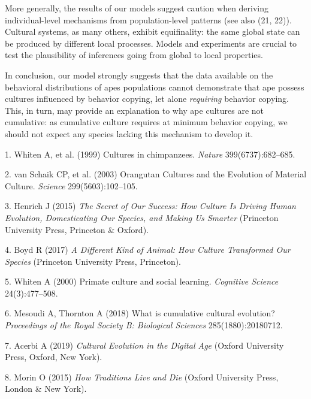 \documentclass[9pt,twocolumn,twoside,]{pnas-new}
\begin{document}
More generally, the results of our models suggest caution when deriving
individual-level mechanisms from population-level patterns (see also
(21, 22)). Cultural systems, as many others, exhibit equifinality: the
same global state can be produced by different local processes. Models
and experiments are crucial to test the plausibility of inferences going
from global to local properties.

In conclusion, our model strongly suggests that the data available on
the behavioral distributions of apes populations cannot demonstrate that
ape possess cultures influenced by behavior copying, let alone
\emph{requiring} behavior copying. This, in turn, may provide an
explanation to why ape cultures are not cumulative: as cumulative
culture requires at minimum behavior copying, we should not expect any
species lacking this mechanism to develop it.

\showmatmethods
\showacknow
\pnasbreak

\hypertarget{refs}{}
\leavevmode\hypertarget{ref-whiten_cultures_1999}{}%
1. Whiten A, et al. (1999) Cultures in chimpanzees. \emph{Nature}
399(6737):682--685.

\leavevmode\hypertarget{ref-van_schaik_orangutan_2003}{}%
2. van Schaik CP, et al. (2003) Orangutan Cultures and the Evolution of
Material Culture. \emph{Science} 299(5603):102--105.

\leavevmode\hypertarget{ref-henrich_secret_2015}{}%
3. Henrich J (2015) \emph{The Secret of Our Success: How Culture Is
Driving Human Evolution, Domesticating Our Species, and Making Us
Smarter} (Princeton University Press, Princeton \& Oxford).

\leavevmode\hypertarget{ref-boyd_different_2017}{}%
4. Boyd R (2017) \emph{A Different Kind of Animal: How Culture
Transformed Our Species} (Princeton University Press, Princeton).

\leavevmode\hypertarget{ref-whiten_primate_2000}{}%
5. Whiten A (2000) Primate culture and social learning. \emph{Cognitive
Science} 24(3):477--508.

\leavevmode\hypertarget{ref-mesoudi_what_2018}{}%
6. Mesoudi A, Thornton A (2018) What is cumulative cultural evolution?
\emph{Proceedings of the Royal Society B: Biological Sciences}
285(1880):20180712.

\leavevmode\hypertarget{ref-acerbi_cultural_2019}{}%
7. Acerbi A (2019) \emph{Cultural Evolution in the Digital Age} (Oxford
University Press, Oxford, New York).

\leavevmode\hypertarget{ref-morin_how_2015}{}%
8. Morin O (2015) \emph{How Traditions Live and Die} (Oxford University
Press, London \& New York).
\end{document}
